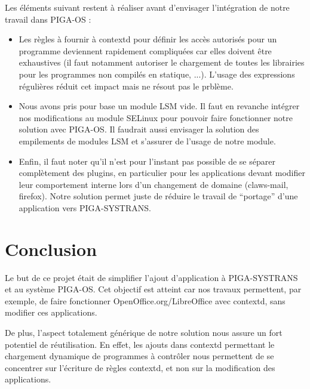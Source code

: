 \documentclass[pdftex,a4paper,titlepage,11pt]{article}
\begin{document}
Les éléments suivant restent à réaliser avant d'envisager l'intégration de notre travail dans PIGA-OS :
	\begin{itemize}
		\item Les règles à fournir à contextd pour définir les accès autorisés pour un programme deviennent rapidement compliquées car elles doivent être exhaustives (il faut notamment autoriser le chargement de toutes les librairies pour les programmes non compilés en statique, ...). L'usage des expressions régulières réduit cet impact mais ne résout pas le prblème.
		\item Nous avons pris pour base un module LSM vide. Il faut en revanche intégrer nos modifications au module SELinux pour pouvoir faire fonctionner notre solution avec PIGA-OS. Il faudrait aussi envisager la solution des empilements de modules LSM et s'assurer de l'usage de notre module.
		\item Enfin, il faut noter qu'il n'est pour l'instant pas possible de se séparer complètement des plugins, en particulier pour les applications devant modifier leur comportement interne lors d'un changement de domaine (claws-mail, firefox). Notre solution permet juste de réduire le travail de ``portage'' d'une application vers PIGA-SYSTRANS.
	\end{itemize}

\newpage

% 
% 

\section*{Conclusion} 

Le but de ce projet était de simplifier l'ajout d'application à PIGA-SYSTRANS et au système PIGA-OS. Cet objectif est atteint car nos travaux permettent, par exemple, de faire fonctionner OpenOffice.org/LibreOffice avec contextd, sans modifier ces applications.

De plus, l'aspect totalement générique de notre solution nous assure un fort potentiel de réutilisation. En effet, les ajouts dans contextd permettant le chargement dynamique de programmes à contrôler nous permettent de se concentrer sur l'écriture de règles contextd, et non sur la modification des applications.
\end{document}
